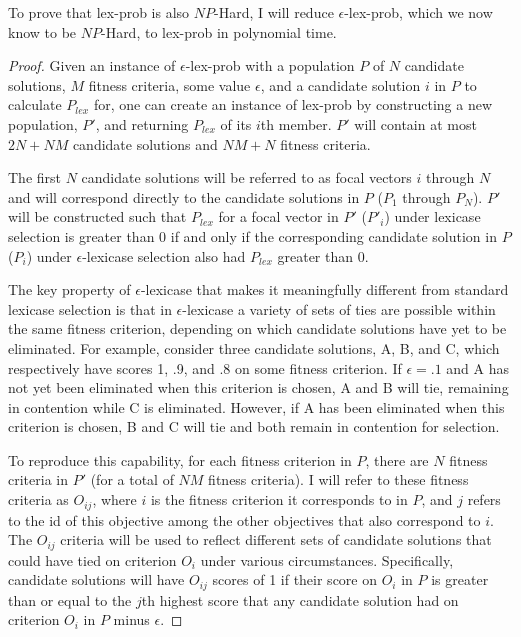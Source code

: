 \documentclass[sigconf]{acmart}
\begin{document}
To prove that {\sc lex-prob} is also $NP$-Hard, I will reduce {\sc $\epsilon$-lex-prob}, which we now know to be $NP$-Hard, to {\sc lex-prob} in polynomial time.

\begin{proof}

Given an instance of {\sc $\epsilon$-lex-prob} with a population $P$ of $N$ candidate solutions, $M$ fitness criteria, some value $\epsilon$, and a candidate solution $i$ in $P$ to calculate $P_{lex}$ for, one can create an instance of {\sc lex-prob} by constructing a new population, $P'$, and returning $P_{lex}$ of its $i$th member. $P'$ will contain at most $2N + NM$ candidate solutions and $NM + N$ fitness criteria. 

The first $N$ candidate solutions will be referred to as focal vectors $i$ through $N$ and will correspond directly to the candidate solutions in $P$ ($P_1$ through $P_N$). $P'$ will be constructed such that $P_{lex}$ for a focal vector in $P'$ ($P'_i$) under lexicase selection is greater than 0 if and only if the corresponding candidate solution in $P$ ($P_i$) under $\epsilon$-lexicase selection also had $P_{lex}$ greater than 0. 

The key property of $\epsilon$-lexicase that makes it meaningfully different from standard lexicase selection is that in $\epsilon$-lexicase a variety of sets of ties are possible within the same fitness criterion, depending on which candidate solutions have yet to be eliminated. For example, consider three candidate solutions, A, B, and C, which respectively have scores 1, .9, and .8 on some fitness criterion. If $\epsilon=.1$ and A has not yet been eliminated when this criterion is chosen, A and B will tie, remaining in contention while C is eliminated. However, if A has been eliminated when this criterion is chosen, B and C will tie and both remain in contention for selection. 

To reproduce this capability, for each fitness criterion in $P$, there are $N$ fitness criteria in $P'$ (for a total of $NM$ fitness criteria). I will refer to these fitness criteria as $O_{ij}$, where $i$ is the fitness criterion it corresponds to in $P$, and $j$ refers to the id of this objective among the other objectives that also correspond to $i$. The $O_{ij}$ criteria will be used to reflect different sets of candidate solutions that could have tied on criterion $O_i$ under various circumstances. Specifically, candidate solutions will have $O_{ij}$ scores of 1 if their score on $O_i$ in $P$ is greater than or equal to the $j$th highest score that any candidate solution had on criterion $O_i$ in $P$ minus $\epsilon$.


\end{proof}
\end{document}
